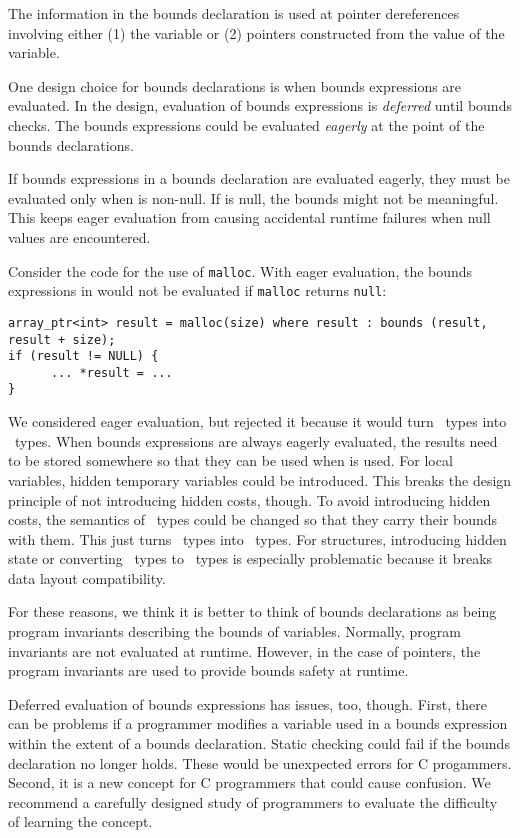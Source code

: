 The information in the bounds declaration is used at pointer
dereferences involving either (1) the variable or (2) pointers
constructed from the value of the variable.

One design choice for bounds declarations is when
bounds expressions are evaluated.  In the design, evaluation of
bounds expressions is {\em deferred} until bounds checks.  The bounds
expressions could be evaluated {\em eagerly} at the point of the bounds declarations.

If bounds expressions in a bounds declaration  are evaluated 
eagerly, they must  be evaluated only when  is non-null. If  is null,
the bounds might not be meaningful.  This keeps eager evaluation from
causing accidental runtime failures when null values are encountered.    

Consider the code for the use of \texttt{malloc}.   With eager evaluation,
the bounds expressions in  would not
be evaluated if \texttt{malloc} returns \texttt{null}:
\begin{verbatim}
array_ptr<int> result = malloc(size) where result : bounds (result, result + size);
if (result != NULL) {
      ... *result = ...
}
\end{verbatim}

We considered eager evaluation, but rejected it because it would turn \arrayptr\
types into \arrayview\ types.  When bounds expressions are always eagerly
evaluated, the results need to be stored somewhere so that they can be used
when \var{v} is used.  For local variables, hidden temporary variables could be
introduced.  This breaks the design principle of not introducing hidden
costs, though.  To avoid introducing hidden costs, the semantics of \arrayptr\ types could 
be changed so that they carry their bounds with them.   This just turns \arrayptr\ types into 
\arrayview\ types.   For structures, introducing hidden state or converting \arrayptr\ types to 
\arrayview\ types is especially problematic because it breaks data layout compatibility.

For these reasons, we think it is better to think of bounds declarations as being
program invariants describing the bounds of variables.   Normally, 
program invariants are not evaluated at runtime.  However, in the case of pointers,
the program invariants are used to provide bounds safety at runtime.

Deferred evaluation of bounds expressions has issues, too, though. First, there
can be problems if a programmer modifies a variable used in a bounds expression
within the extent of a bounds declaration.  Static checking could fail if the
bounds declaration no longer holds.  These would be unexpected errors for
C progammers.  Second, it is a new concept for C programmers that could
cause confusion.  We recommend a carefully designed study of
programmers to evaluate the difficulty of learning the concept.

